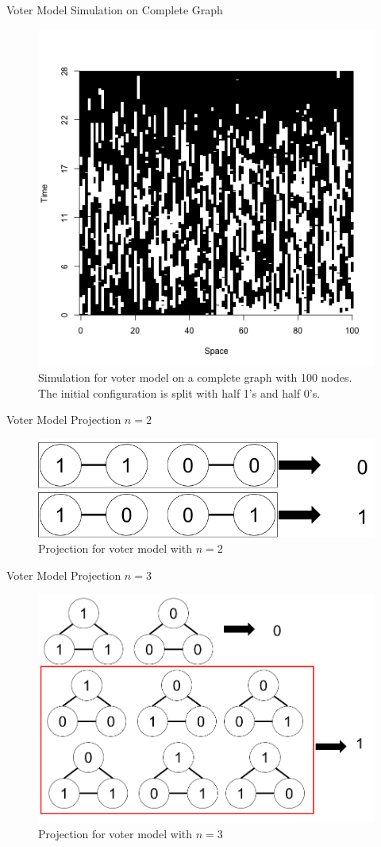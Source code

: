 \documentclass{beamer}
\theoremstyle{definition}
\begin{document}
\begin{frame}{Voter Model Simulation on Complete Graph}
\begin{figure}[H]
  \centering
    \includegraphics[width=.6\textwidth]{figures/voter_simulation_1d_complete_split_100.png}
   \caption{Simulation for voter model on a complete graph with 100 nodes. The initial configuration is split with half 1's and half 0's.}
  \label{fig:voter_sim_1d_complete.png}
\end{figure}
\end{frame}

\begin{frame}{Voter Model Projection $n = 2$}
    \begin{figure}[H]
  \centering
    \includegraphics[width=.8\textwidth]{figures/voter_model_proj_2.png}
   \caption{Projection for voter model with $n = 2$}
  \label{fig:voter_sim_1d_torus.png}
\end{figure}
\end{frame}

\begin{frame}{Voter Model Projection $n = 3$}
    \begin{figure}[H]
  \centering
    \includegraphics[width=.8\textwidth]{figures/voter_model_proj_3.png}
   \caption{Projection for voter model with $n = 3$}
  \label{fig:voter_sim_1d_torus.png}
\end{figure}
\end{frame}
\end{document}
